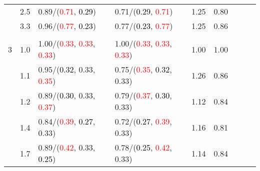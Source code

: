 \documentclass[10pt,a4paper]{report}
\begin{document}
\begin{table}[!htbp]
\begin{center}
{\begin{tabular}{ccllccccc}
				  & 2.5                               & 0.89/(\textcolor{red}{0.71}, \textcolor{black}{0.29})                                             & 0.71/(\textcolor{black}{0.29}, \textcolor{red}{0.71})                                             & 1.25             & 0.80                     \\
				  & 3.3                               & 0.96/(\textcolor{red}{0.77}, \textcolor{black}{0.23})                                             & 0.77/(\textcolor{black}{0.23}, \textcolor{red}{0.77})                                             & 1.25             & 0.86                     \\
				  &                                   &                                                                                                   &                                                                                                   &                                             \\
				3 & 1.0                               & 1.00/(\textcolor{red}{0.33}, \textcolor{red}{0.33}, \textcolor{red}{0.33})                        & 1.00/(\textcolor{red}{0.33}, \textcolor{red}{0.33}, \textcolor{red}{0.33})                        & 1.00             & 1.00                     \\
				  & 1.1                               & 0.95/(\textcolor{black}{0.32}, 0.33, \textcolor{red}{0.35})                                       & 0.75/(\textcolor{red}{0.35}, \textcolor{black}{0.32}, 0.33)                                       & 1.26             & 0.86                     \\
				  & 1.2                               & 0.89/(\textcolor{black}{0.30}, 0.33, \textcolor{red}{0.37})                                       & 0.79/(\textcolor{red}{0.37}, \textcolor{black}{0.30}, 0.33)                                       & 1.12             & 0.84                     \\
				  & 1.4                               & 0.84/(\textcolor{red}{0.39}, \textcolor{black}{0.27}, 0.33)                                       & 0.72/(\textcolor{black}{0.27}, \textcolor{red}{0.39}, 0.33)                                       & 1.16             & 0.81                     \\
				  & 1.7                               & 0.89/(\textcolor{red}{0.42}, 0.33, \textcolor{black}{0.25})                                       & 0.78/(\textcolor{black}{0.25}, \textcolor{red}{0.42}, 0.33)                                       & 1.14             & 0.84                     \\

\end{tabular}}
\end{center}
\end{table}
\end{document}
